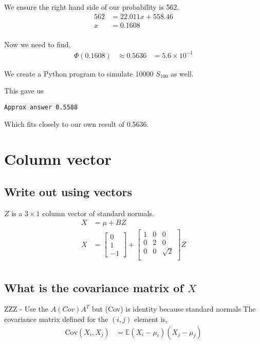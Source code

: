 \documentclass{article}
\newcommand{\expect}{\mathbb{E}}
\begin{document}
We ensure the right hand side of our probability is 562.
\begin{align*}
    562 &= 22.011 x + 558.46 \\
    x &= 0.1608 \\
\end{align*}

Now we need to find,
\begin{align*}
    \Phi(0.1608) &\approx 0.5636
    &= 5.6 \times 10^{-1}
\end{align*}

We create a Python program to simulate 10000 $S_{100}$ as well.


This gave us
\begin{verbatim}
Approx answer 0.5588
\end{verbatim}

Which fits closely to our own result of 0.5636.

\section{Column vector}
\subsection{Write out using vectors}
$Z$ is a $3\times1$ column vector of standard normals.
\begin{align*}
    X &= \mu + BZ \\
    X
    &=
    \begin{bmatrix}
        0 \\ 1 \\ -1
    \end{bmatrix}
    +
    \begin{bmatrix}
        1 & 0 & 0 \\
        0 & 2 & 0 \\
        0 & 0 & \sqrt{2} \\
    \end{bmatrix}
    Z \\
\end{align*}

\subsection{What is the covariance matrix of $X$}
ZZZ - Use the $A (Cov) A^T$ but (Cov) is identity because standard normals
The covariance matrix defined for the $(i,j)$ element is,
\begin{align*}
    \text{Cov}(X_i,X_j) & = \expect (X_i - \mu_i)(X_j - \mu_j) \\
\end{align*}
\end{document}
